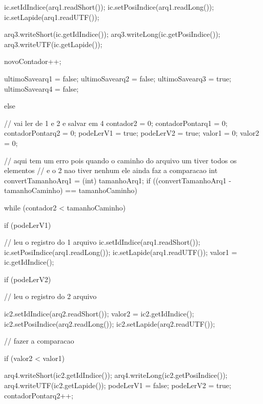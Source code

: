 {{{{{{                  ic.setIdIndice(arq1.readShort());
                  ic.setPosiIndice(arq1.readLong());
                  ic.setLapide(arq1.readUTF());

                  arq3.writeShort(ic.getIdIndice());
                  arq3.writeLong(ic.getPosiIndice());
                  arq3.writeUTF(ic.getLapide());

                  novoContador++;
                }
                ultimoSavearq1 = false;
                ultimoSavearq2 = false;
                ultimoSavearq3 = true;
                ultimoSavearq4 = false;
              }

            } else {// vai ler de 1 e 2 e salvar em 4
              contador2 = 0;
              contadorPontarq1 = 0;
              contadorPontarq2 = 0;
              podeLerV1 = true;
              podeLerV2 = true;
              valor1 = 0;
              valor2 = 0;

              // aqui tem um erro pois quando o caminho do arquivo um tiver todos os elementos
              // e o 2 nao tiver nenhum ele ainda faz a comparacao
              int convertTamanhoArq1 = (int) tamanhoArq1;
              if ((convertTamanhoArq1 - tamanhoCaminho) == tamanhoCaminho) {

                while (contador2 < tamanhoCaminho) {

                  if (podeLerV1) {
                    // leu o registro do 1 arquivo
                    ic.setIdIndice(arq1.readShort());
                    ic.setPosiIndice(arq1.readLong());
                    ic.setLapide(arq1.readUTF());
                    valor1 = ic.getIdIndice();

                  }

                  if (podeLerV2) {
                    // leu o registro do 2 arquivo

                    ic2.setIdIndice(arq2.readShort());
                    valor2 = ic2.getIdIndice();
                    ic2.setPosiIndice(arq2.readLong());
                    ic2.setLapide(arq2.readUTF());

                  }

                  // fazer a comparacao

                  if (valor2 < valor1) {

                    arq4.writeShort(ic2.getIdIndice());
                    arq4.writeLong(ic2.getPosiIndice());
                    arq4.writeUTF(ic2.getLapide());
                    podeLerV1 = false;
                    podeLerV2 = true;
                    contadorPontarq2++;

}}}}}}}
